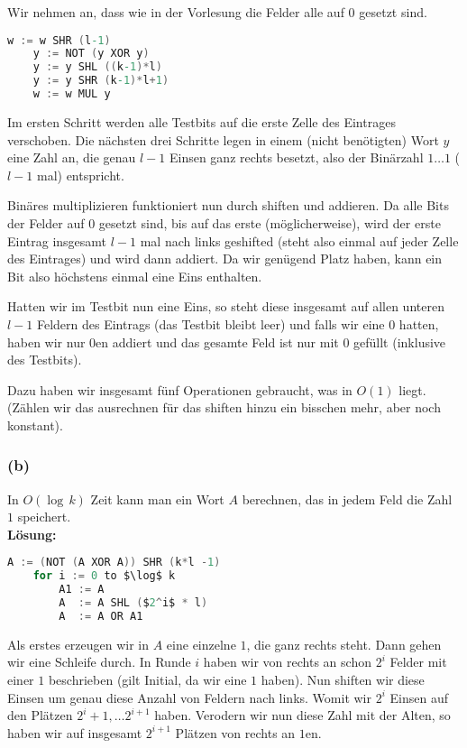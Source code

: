 \documentclass[11pt,a4paper,ngerman]{article}
\begin{document}
Wir nehmen an, dass wie in der Vorlesung die Felder alle auf $0$ gesetzt sind.

\begin{lstlisting}[frame=single, language=C,morekeywords={:=,SHR,SHL,NOT,XOR,AND,OR,MUL}]
	w := w SHR (l-1)
	y := NOT (y XOR y)
	y := y SHL ((k-1)*l)
	y := y SHR (k-1)*l+1)
	w := w MUL y
\end{lstlisting}

Im ersten Schritt werden alle Testbits auf die erste Zelle des Eintrages verschoben. Die nächsten drei Schritte
legen in einem (nicht benötigten) Wort $y$ eine Zahl an, die genau $l-1$ Einsen ganz rechts besetzt, also der Binärzahl
$1\ldots1$ ($l-1$ mal) entspricht.

Binäres multiplizieren funktioniert nun durch shiften und addieren. Da alle Bits der Felder auf $0$ gesetzt sind, bis auf das erste (möglicherweise),
wird der erste Eintrag insgesamt $l-1$ mal nach links geshifted (steht also einmal auf jeder Zelle des Eintrages) und wird dann addiert.
Da wir genügend Platz haben, kann ein Bit also höchstens einmal eine Eins enthalten.

Hatten wir im Testbit nun eine Eins, so steht diese insgesamt auf allen unteren $l-1$ Feldern des Eintrags (das Testbit bleibt leer) und
falls wir eine $0$ hatten, haben wir nur $0$en addiert und das gesamte Feld ist nur mit $0$ gefüllt (inklusive des Testbits).

Dazu haben wir insgesamt fünf Operationen gebraucht, was in $O(1)$ liegt. (Zählen wir das ausrechnen für das shiften hinzu ein bisschen mehr, aber noch konstant).

\subsubsection*{(b)}
In $O(\log \, k)$ Zeit kann man ein Wort $A$ berechnen, das in jedem Feld die Zahl $1$ speichert.\\

\noindent\textbf{Lösung:}\\

\begin{lstlisting}[frame=single, language=C,morekeywords={:=,SHR,SHL,NOT,XOR,AND,OR,MUL}]
	A := (NOT (A XOR A)) SHR (k*l -1)
	for i := 0 to $\log$ k
		A1 := A
		A  := A SHL ($2^i$ * l)
		A  := A OR A1
\end{lstlisting}

Als erstes erzeugen wir in $A$ eine einzelne $1$, die ganz rechts steht. Dann gehen wir eine Schleife durch. In Runde $i$ haben
wir von rechts an schon $2^i$ Felder mit einer $1$ beschrieben (gilt Initial, da wir eine $1$ haben). Nun shiften wir diese Einsen
um genau diese Anzahl von Feldern nach links. Womit wir $2^i$ Einsen auf den Plätzen $2^i+1, \ldots 2^{i+1}$ haben. 
Verodern wir nun diese Zahl mit der Alten, so haben wir auf insgesamt $2^{i+1}$ Plätzen von rechts an $1$en.
\end{document}
